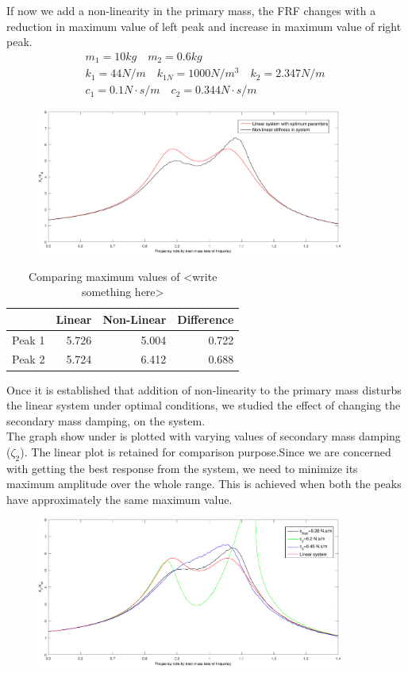 If now we add a non-linearity in the primary mass,
the FRF changes with a reduction in maximum value of left peak and increase in maximum value of right peak.
\begin{align*}
&m_1 = 10kg\quad m_2 = 0.6kg\quad \\
&k_1=44 N/m\quad
k_{1N} = 1000 N/m^3\quad k_2 = 2.347 N/m \quad \\
&c_1 = 0.1 N\cdot s/m \quad
c_2 = 0.344 N\cdot s/m 
\end{align*}
\begin{figure}[h!]
\includegraphics[width=0.9\textwidth]{"figures/nonlinear"}
\end{figure}
\begin{table}
\centering
\begin{tabular}{|r|r|r|r|}
\hline
 & Linear & Non-Linear & Difference \\ \hline
Peak 1 & 5.726 & 5.004 & 0.722\\
Peak 2 & 5.724  & 6.412 & 0.688\\ \hline
\end{tabular}
\caption{Comparing maximum values of <write something here> }
\end{table}
Once it is established that addition of non-linearity to the primary mass disturbs the linear system under optimal conditions, we studied the effect of changing the secondary mass damping, on the system.\\
The graph show under is plotted with varying values of secondary mass damping ($\zeta_2$). The linear plot is retained for comparison purpose.Since we are concerned with getting the best response from the system, we need to minimize its maximum amplitude over the whole range. This is achieved when both the peaks have approximately the same maximum value.\\[0.2in]
\begin{figure}[h!]
\includegraphics[width=0.9\textwidth]{"figures/change"}\\[0.2in] 
\end{figure}
